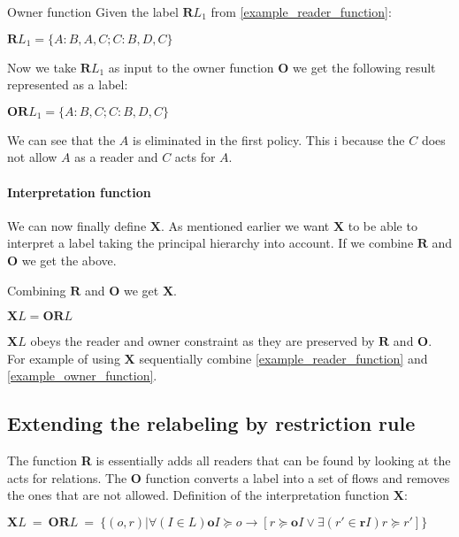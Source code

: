 \begin{example}{Owner function}\label{example_owner_function}
  Given the label $\textbf{R}L_1$ from \cref{example_reader_function}:
  \begin{center}
    $\textbf{R}L_1 = \{A:B,A,C; C:B,D,C\}$
  \end{center}
  Now we take $\textbf{R}L_1$ as input to the owner function $\textbf{O}$ we get the following result represented as a label:
  \begin{center}
    $\textbf{OR}L_1 = \{A:B,C; C:B,D,C\}$
  \end{center}
  We can see that the $A$ is eliminated in the first policy.
  This i because the $C$ does not allow $A$ as a reader and $C$ acts for $A$. 
\end{example}

\paragraph{Interpretation function}
We can now finally define $\textbf{X}$.
As mentioned earlier we want $\textbf{X}$ to be able to interpret a label taking the principal hierarchy into account.
If we combine $\textbf{R}$ and $\textbf{O}$ we get the above.
\begin{definition}
  Combining $\textbf{R}$ and $\textbf{O}$ we get $\textbf{X}$.
  \begin{center}
    $\textbf{X}L = \textbf{OR}L$
  \end{center}
\end{definition}
$\textbf{X}L$ obeys the reader and owner constraint as they are preserved by $\textbf{R}$ and $\textbf{O}$.
For example of using $\textbf{X}$ sequentially combine \cref{example_reader_function} and \cref{example_owner_function}.


\subsection{Extending the relabeling by restriction rule}




The function \textbf{R} is essentially adds all readers that can be found by looking at the acts for relations.
The \textbf{O} function converts a label into a set of flows and removes the ones that are not allowed.
Definition of the interpretation function $\textbf{X}$:
\begin{definition}
  $\textbf{X}L \ = \ \textbf{OR}L \ = \ \{(o,r)|\forall (I \in L) \textbf{o}I \succeq o \rightarrow [r \succeq \textbf{o}I \vee \exists (r' \in \textbf{r}I) r \succeq r'] \}$
\end{definition}

